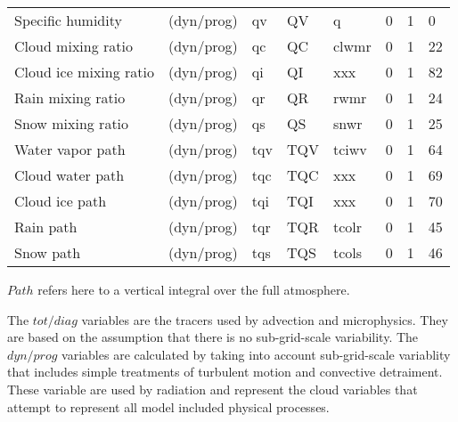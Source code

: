\documentclass[a4paper,11pt,landscape,notitlepage]{article}
\begin{document}
\begin{centering}
\begin{tabular}{l l l l l l l l}
\hline                                                                                                                                                         
Specific humidity      &  (dyn/prog)   &  qv                     &  QV                    &  q                       &  0                  &     1             &        0   \\
Cloud mixing ratio     &  (dyn/prog)   &  qc                     &  QC                    &  clwmr                   &  0                  &     1             &        22  \\
Cloud ice mixing ratio &  (dyn/prog)   &  qi                     &  QI                    &  xxx                     &  0                  &     1             &        82  \\
Rain mixing ratio      &  (dyn/prog)   &  qr                     &  QR                    &  rwmr                    &  0                  &     1             &        24  \\
Snow mixing ratio      &  (dyn/prog)   &  qs                     &  QS                    &  snwr                    &  0                  &     1             &        25  \\
Water vapor path       &  (dyn/prog)   &  tqv                    &  TQV                   &  tciwv                   &  0                  &     1             &        64  \\
Cloud water path       &  (dyn/prog)   &  tqc                    &  TQC                   &  xxx                     &  0                  &     1             &        69  \\
Cloud ice path         &  (dyn/prog)   &  tqi                    &  TQI                   &  xxx                     &  0                  &     1             &        70  \\
Rain path              &  (dyn/prog)   &  tqr                    &  TQR                   &  tcolr                   &  0                  &     1             &        45  \\
Snow path              &  (dyn/prog)   &  tqs                    &  TQS                   &  tcols                   &  0                  &     1             &        46  \\
\hline
\end{tabular}
\end{centering}


$Path$ refers here to a vertical integral over the full atmosphere. 

The $tot/diag$ variables are the tracers used by advection and microphysics.  
They are based on the assumption that there is no sub-grid-scale variability.  The $dyn/prog$ variables are calculated by taking into account 
sub-grid-scale variablity that includes simple treatments of turbulent motion and convective detraiment.  These variable are used by radiation and 
represent the cloud variables that attempt to represent all model included physical processes.
\end{document}
